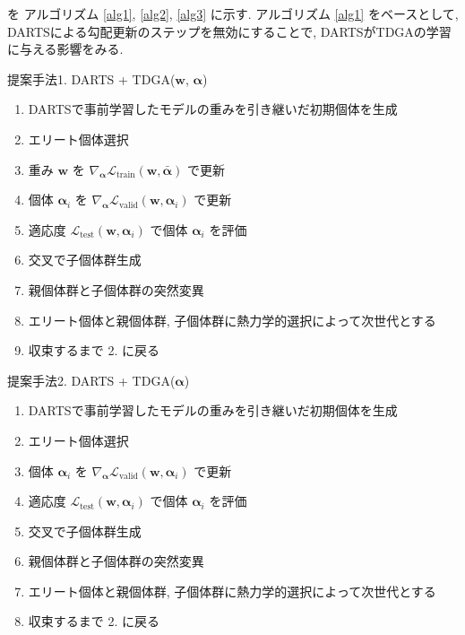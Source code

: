 \noindent
を アルゴリズム \ref{alg1}, \ref{alg2}, \ref{alg3} に示す.
アルゴリズム \ref{alg1} をベースとして, DARTSによる勾配更新のステップを無効にすることで,
DARTSがTDGAの学習に与える影響をみる.

\begin{algorithm}[tb]
  \caption{提案手法1. DARTS + TDGA($\bm{w}$, $\bm{\alpha}$)}
  \label{alg1}
  \begin{enumerate}
    \item DARTSで事前学習したモデルの重みを引き継いだ初期個体を生成
    \item エリート個体選択
    \item 重み $\bm{w}$ を $\displaystyle \nabla_{\bm{\alpha}} \mathcal{L}_{\mathrm{train}}(\bm{w}, \bar{\bm{\alpha}})$ で更新
    \item 個体 $\bm{\alpha}_i$ を $\displaystyle \nabla_{\bm{\alpha}} \mathcal{L}_{\mathrm{valid}}(\bm{w}, \bm{\alpha}_i)$ で更新
    \item 適応度 $\displaystyle \mathcal{L}_{\mathrm{test}}(\bm{w}, \bm{\alpha}_i)$ で個体 $\bm{\alpha}_i$ を評価
    \item 交叉で子個体群生成
    \item 親個体群と子個体群の突然変異
    \item エリート個体と親個体群, 子個体群に熱力学的選択によって次世代とする
    \item 収束するまで 2. に戻る
  \end{enumerate}
\end{algorithm}


\begin{algorithm}[tb]
  \caption{提案手法2. DARTS + TDGA($\bm{\alpha}$)}
  \label{alg2}
  \begin{enumerate}
    \item DARTSで事前学習したモデルの重みを引き継いだ初期個体を生成
    \item エリート個体選択
    \item 個体 $\bm{\alpha}_i$ を $\displaystyle \nabla_{\bm{\alpha}} \mathcal{L}_{\mathrm{valid}}(\bm{w}, \bm{\alpha}_i)$ で更新
    \item 適応度 $\displaystyle \mathcal{L}_{\mathrm{test}}(\bm{w}, \bm{\alpha}_i)$ で個体 $\bm{\alpha}_i$ を評価
    \item 交叉で子個体群生成
    \item 親個体群と子個体群の突然変異
    \item エリート個体と親個体群, 子個体群に熱力学的選択によって次世代とする
    \item 収束するまで 2. に戻る
  \end{enumerate}
\end{algorithm}

